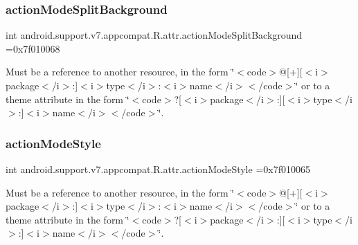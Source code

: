 \subsubsection{\texorpdfstring{action\+Mode\+Split\+Background}{actionModeSplitBackground}}
{\footnotesize\ttfamily int android.\+support.\+v7.\+appcompat.\+R.\+attr.\+action\+Mode\+Split\+Background =0x7f010068\hspace{0.3cm}{\ttfamily [static]}}

Must be a reference to another resource, in the form \char`\"{}$<$code$>$@\mbox{[}+\mbox{]}\mbox{[}$<$i$>$package$<$/i$>$\+:\mbox{]}$<$i$>$type$<$/i$>$\+:$<$i$>$name$<$/i$>$$<$/code$>$\char`\"{} or to a theme attribute in the form \char`\"{}$<$code$>$?\mbox{[}$<$i$>$package$<$/i$>$\+:\mbox{]}\mbox{[}$<$i$>$type$<$/i$>$\+:\mbox{]}$<$i$>$name$<$/i$>$$<$/code$>$\char`\"{}. \mbox{\label{classandroid_1_1support_1_1v7_1_1appcompat_1_1R_1_1attr_aa62226bc0f0b851e6c4ba0e7ce6303e9}} 
\subsubsection{\texorpdfstring{action\+Mode\+Style}{actionModeStyle}}
{\footnotesize\ttfamily int android.\+support.\+v7.\+appcompat.\+R.\+attr.\+action\+Mode\+Style =0x7f010065\hspace{0.3cm}{\ttfamily [static]}}

Must be a reference to another resource, in the form \char`\"{}$<$code$>$@\mbox{[}+\mbox{]}\mbox{[}$<$i$>$package$<$/i$>$\+:\mbox{]}$<$i$>$type$<$/i$>$\+:$<$i$>$name$<$/i$>$$<$/code$>$\char`\"{} or to a theme attribute in the form \char`\"{}$<$code$>$?\mbox{[}$<$i$>$package$<$/i$>$\+:\mbox{]}\mbox{[}$<$i$>$type$<$/i$>$\+:\mbox{]}$<$i$>$name$<$/i$>$$<$/code$>$\char`\"{}. \mbox{\label{classandroid_1_1support_1_1v7_1_1appcompat_1_1R_1_1attr_a4d77b136a61a153fead099d874a18831}} 
